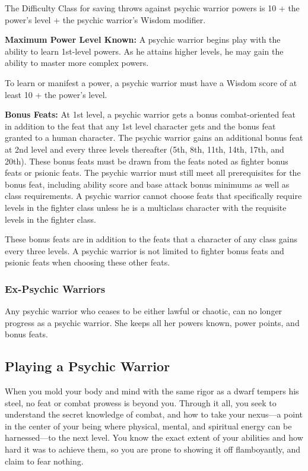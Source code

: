 The Difficulty Class for saving throws against psychic warrior powers is 10 + the power's level + the psychic warrior's Wisdom modifier.

\textbf{Maximum Power Level Known:} A psychic warrior begins play with the ability to learn 1st-level powers. As he attains higher levels, he may gain the ability to master more complex powers.

To learn or manifest a power, a psychic warrior must have a Wisdom score of at least 10 + the power's level.

\textbf{Bonus Feats:} At 1st level, a psychic warrior gets a bonus combat-oriented feat in addition to the feat that any 1st level character gets and the bonus feat granted to a human character. The psychic warrior gains an additional bonus feat at 2nd level and every three levels thereafter (5th, 8th, 11th, 14th, 17th, and 20th). These bonus feats must be drawn from the feats noted as fighter bonus feats or psionic feats. The psychic warrior must still meet all prerequisites for the bonus feat, including ability score and base attack bonus minimums as well as class requirements. A psychic warrior cannot choose feats that specifically require levels in the fighter class unless he is a multiclass character with the requisite levels in the fighter class.

These bonus feats are in addition to the feats that a character of any class gains every three levels. A psychic warrior is not limited to fighter bonus feats and psionic feats when choosing these other feats.

\subsubsection{Ex-Psychic Warriors}
Any psychic warrior who ceases to be either lawful or chaotic, can no longer progress as a psychic warrior. She keeps all her powers known, power points, and bonus feats.

\subsection{Playing a Psychic Warrior}
When you mold your body and mind with the same rigor as a dwarf tempers his steel, no feat or combat prowess is beyond you. Through it all, you seek to understand the secret knowledge of combat, and how to take your nexus---a point in the center of your being where physical, mental, and spiritual energy can be harnessed---to the next level. You know the exact extent of your abilities and how hard it was to achieve them, so you are prone to showing it off flamboyantly, and claim to fear nothing.

